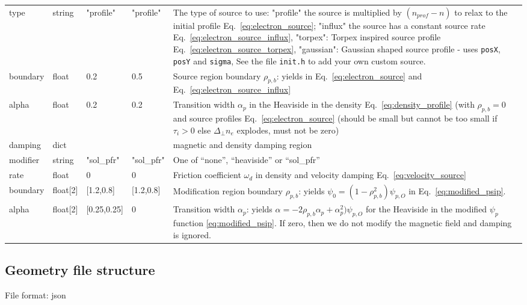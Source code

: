 \begin{longtable}{llllp{6cm}}
\qquad type & string & "profile" & "profile" & The type of source to use: "profile" the source is multiplied by $(n_{prof} - n)$ to relax to the initial profile Eq.~\eqref{eq:electron_source};
"influx" the source has a constant source rate Eq.~\eqref{eq:electron_source_influx},
"torpex": Torpex inspired source profile Eq.~\eqref{eq:electron_source_torpex},
"gaussian": Gaussian shaped source profile - uses \texttt{posX}, \texttt{posY} and \texttt{sigma},
    See the file {\tt init.h} to add your own custom source.
\\
\qquad boundary & float & 0.2  & 0.5 & Source region boundary $\rho_{p,b}$: yields in Eq.~\eqref{eq:electron_source} and Eq.~\eqref{eq:electron_source_influx}  \\
\qquad alpha  & float & 0.2 & 0.2 & Transition width $\alpha_p$ in the Heaviside
in the density Eq.~\eqref{eq:density_profile} (with $\rho_{p,b}=0$ and source profiles Eq.~\eqref{eq:electron_source} (should be
small but cannot be too small if $\tau_i > 0$ else $\Delta_\perp n_e$ explodes, must not be zero)
\\
damping & dict & & & magnetic and density damping region \\
\qquad modifier & string & "sol\_pfr" & "sol\_pfr" & One of ``none'', ``heaviside'' or ``sol\_pfr'' \\
\qquad rate & float & 0    & 0   & Friction coefficient $\omega_d$ in density and velocity damping Eq.~\eqref{eq:velocity_source} \\
\qquad boundary & float[2] & [1.2,0.8]  & [1.2,0.8] & Modification region boundary $\rho_{p,b}$: yields $\psi_0 = (1-\rho_{p,b}^2)\psi_{p,O}$ in Eq.~\eqref{eq:modified_psip}.
\\
\qquad alpha   & float[2] & [0.25,0.25] & 0 & Transition width $\alpha_p$: yields
$\alpha=-2\rho_{p,b}\alpha_p+\alpha_p^2)\psi_{p,O}$ for the Heaviside in the modified
$\psi_p$ function \eqref{eq:modified_psip}. If zero, then we do not modify the
magnetic field and damping is ignored.\\
\bottomrule
\end{longtable}
\subsection{Geometry file structure} \label{sec:geometry_file}
File format: json

